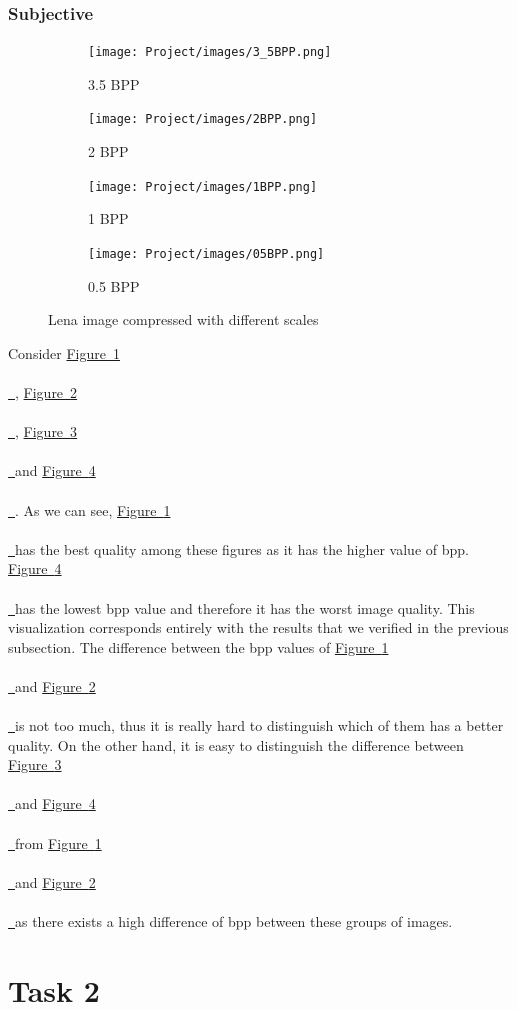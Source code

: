 \documentclass{article}
\newcommand*{\figref}[2][]{%
  \hyperref[{fig:#2}]{%
    Figure~\ref*{fig:#2}%
    \ifx\\#1\\%
    \else
      \,#1%
    \fi
  }%
}
\begin{document}
\subsubsection{Subjective}

\begin{figure}[H]
  \centering
  
  \begin{subfigure}{0.45\textwidth}
    \centering
    \texttt{[image: Project/images/3\_5BPP.png]}
    \caption{3.5 BPP}
    \label{fig:subfig1}
  \end{subfigure}
  \hfill
  \begin{subfigure}{0.45\textwidth}
    \centering
    \texttt{[image: Project/images/2BPP.png]}
    \caption{2 BPP}
    \label{fig:subfig2}
  \end{subfigure}
  
  \vspace{1em}
  
  \begin{subfigure}{0.45\textwidth}
    \centering
    \texttt{[image: Project/images/1BPP.png]}
    \caption{1 BPP}
    \label{fig:subfig3}
  \end{subfigure}
  \hfill
  \begin{subfigure}{0.45\textwidth}
    \centering
    \texttt{[image: Project/images/05BPP.png]}
    \caption{0.5 BPP}
    \label{fig:subfig4}
  \end{subfigure}
  
  \caption{Lena image compressed with different scales}
  \label{fig:subplots}
\end{figure}



Consider \figref{subfig1}, \figref{subfig2}, \figref{subfig3} and \figref{subfig4}. As we can see, \figref{subfig1} has the best quality among these figures as it has the higher value of bpp. \figref{subfig4} has the lowest bpp value and therefore it has the worst image quality. This visualization corresponds entirely with the results that we verified in the previous subsection. The difference between the bpp values of \figref{subfig1} and \figref{subfig2} is not too much, thus it is really hard to distinguish which of them has a better quality. On the other hand, it is easy to distinguish the difference between \figref{subfig3} and \figref{subfig4} from \figref{subfig1} and \figref{subfig2} as there exists a high difference of bpp between these groups of images. 




\section{Task 2}
\end{document}
